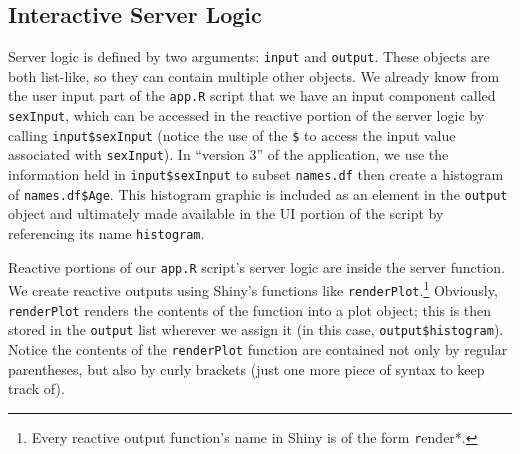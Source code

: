 \documentclass[12pt,oneside]{book}\usepackage[]{graphicx}\usepackage[]{color}
\begin{document}
\subsection{Interactive Server Logic}

Server logic is defined by two arguments: \verb+input+ and \verb+output+. These objects are both list-like, so they can contain multiple other objects. We already know from the user input part of the \verb+app.R+ script that we have an input component called \verb+sexInput+, which can be accessed in the reactive portion of the server logic by calling \verb+input$sexInput+ (notice the use of the \verb+$+ to access the input value associated with \verb+sexInput+). In ``version 3'' of the application, we use the information held in \verb+input$sexInput+ to subset \verb+names.df+ then create a histogram of \verb+names.df$Age+. This histogram graphic is included as an element in the \verb+output+ object and ultimately made available in the UI portion of the script by referencing its name \verb+histogram+.

Reactive portions of our \verb+app.R+ script's server logic are inside the server function. We create reactive outputs using Shiny's functions like \verb+renderPlot+.\footnote{Every reactive output function's name in Shiny is of the form {\texttt render*}.} Obviously, \verb+renderPlot+ renders the contents of the function into a plot object; this is then stored in the \verb+output+ list wherever we assign it (in this case, \verb+output$histogram+). Notice the contents of the \verb+renderPlot+ function are contained not only by regular parentheses, but also by curly brackets (just one more piece of syntax to keep track of).
\end{document}
